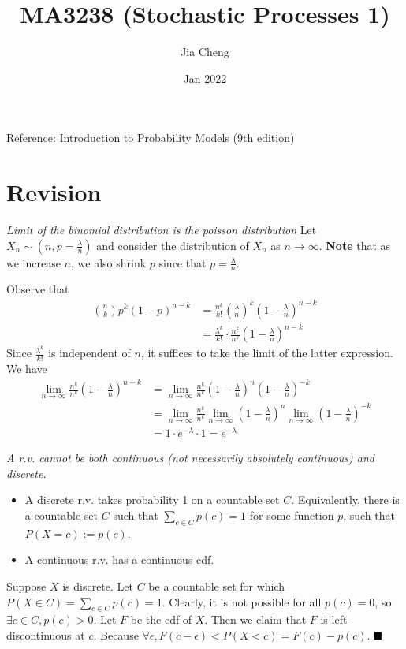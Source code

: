 \documentclass[a4paper]{article}
\title{MA3238 (Stochastic Processes 1)}
\author{Jia Cheng}
\date{Jan 2022}
\newcommand{\rbracket}[1]{\left(#1\right)} %
\newcommand{\limitinf}[1][n]{\lim_{#1\rightarrow \infty}} %
\newcommand{\qedsymbol}{\hfill\blacksquare} %
\begin{document}
\maketitle

Reference: Introduction to Probability Models (9th edition)

\section{Revision}

\emph{Limit of the binomial distribution is the poisson distribution} Let $X_n\sim (n, p=\frac{\lambda}{n})$ and consider the distribution of $X_n$ as $n\rightarrow \infty$. \textbf{Note} that as we increase $n$, we also shrink $p$ since that $p=\frac{\lambda}{n}$.

Observe that \begin{align*}
	\binom{n}{k}p^k(1-p)^{n-k} &= \frac{n^{\underline{k}}}{k!} \rbracket{\frac{\lambda}{n}}^k \rbracket{1-\frac{\lambda}{n}}^{n-k}\\
	&= \frac{\lambda^k}{k!}\cdot \frac{n^{\underline{k}}}{n^k}\rbracket{1-\frac{\lambda}{n}}^{n-k}
\end{align*}
Since $\frac{\lambda^k}{k!}$ is independent of $n$, it suffices to take the limit of the latter expression. We have
\begin{align*}
	\limitinf \frac{n^{\underline{k}}}{n^k}\rbracket{1-\frac{\lambda}{n}}^{n-k} &= \limitinf \frac{n^{\underline{k}}}{n^k}\rbracket{1-\frac{\lambda}{n}}^{n} \rbracket{1-\frac{\lambda}{n}}^{-k}\\
	&= \limitinf \frac{n^{\underline{k}}}{n^k}\limitinf\rbracket{1-\frac{\lambda}{n}}^{n} \limitinf\rbracket{1-\frac{\lambda}{n}}^{-k}\\
	&= 1\cdot e^{-\lambda}\cdot 1 = e^{-\lambda}
\end{align*}

\emph{A r.v. cannot be both continuous (not necessarily absolutely continuous) and discrete.}

\begin{itemize}
	\item A discrete r.v. takes probability 1 on a countable set $C$. Equivalently, there is a countable set $C$ such that $\sum_{c\in C}p(c) = 1$ for some function $p$, such that $P(X=c) := p(c)$.
	\item A continuous r.v. has a continuous cdf.
\end{itemize}

Suppose $X$ is discrete. Let $C$ be a countable set for which $P(X\in C) = \sum_{c\in C} p(c) =  1$. Clearly, it is not possible for all $p(c) = 0$, so $\exists c\in C, p(c) > 0$. Let $F$ be the cdf of $X$. Then we claim that $F$ is left-discontinuous at $c$. Because $\forall \epsilon, F(c-\epsilon) < P(X < c) = F(c) - p(c)$. $\qedsymbol$
\end{document}
